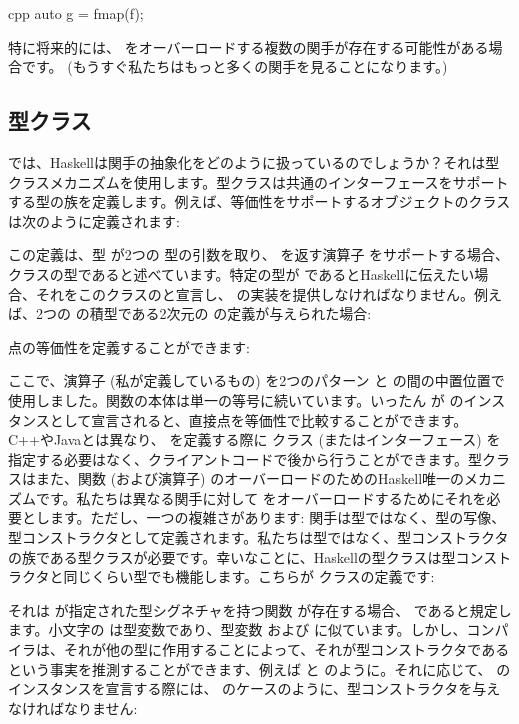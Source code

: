 \begin{snip}{cpp}
auto g = fmap(f);
\end{snip}
特に将来的には、 をオーバーロードする複数の関手が存在する可能性がある場合です。 (もうすぐ私たちはもっと多くの関手を見ることになります。) 

\subsection{型クラス}

では、Haskellは関手の抽象化をどのように扱っているのでしょうか？それは型クラスメカニズムを使用します。型クラスは共通のインターフェースをサポートする型の族を定義します。例えば、等価性をサポートするオブジェクトのクラスは次のように定義されます: 

この定義は、型  が2つの  型の引数を取り、 を返す演算子 \code{(==)} をサポートする場合、 クラスの型であると述べています。特定の型が  であるとHaskellに伝えたい場合、それをこのクラスのと宣言し、\code{(==)} の実装を提供しなければなりません。例えば、2つの  の積型である2次元の  の定義が与えられた場合: 

点の等価性を定義することができます: 

ここで、演算子 \code{(==)} (私が定義しているもの) を2つのパターン  と  の間の中置位置で使用しました。関数の本体は単一の等号に続いています。いったん  が  のインスタンスとして宣言されると、直接点を等価性で比較することができます。C++やJavaとは異なり、 を定義する際に  クラス (またはインターフェース) を指定する必要はなく、クライアントコードで後から行うことができます。型クラスはまた、関数 (および演算子) のオーバーロードのためのHaskell唯一のメカニズムです。私たちは異なる関手に対して  をオーバーロードするためにそれを必要とします。ただし、一つの複雑さがあります: 関手は型ではなく、型の写像、型コンストラクタとして定義されます。私たちは型ではなく、型コンストラクタの族である型クラスが必要です。幸いなことに、Haskellの型クラスは型コンストラクタと同じくらい型でも機能します。こちらが  クラスの定義です: 

それは  が指定された型シグネチャを持つ関数  が存在する場合、 であると規定します。小文字の  は型変数であり、型変数  および  に似ています。しかし、コンパイラは、それが他の型に作用することによって、それが型コンストラクタであるという事実を推測することができます、例えば  と  のように。それに応じて、 のインスタンスを宣言する際には、 のケースのように、型コンストラクタを与えなければなりません: 

